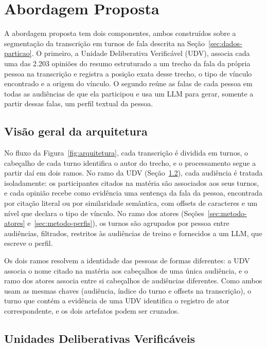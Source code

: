 \section{Abordagem Proposta}
\label{sec:metodo}

A abordagem proposta tem dois componentes, ambos construídos sobre a segmentação da transcrição em
turnos de fala descrita na Seção~\ref{sec:dados-particao}. O primeiro, a Unidade Deliberativa
Verificável (UDV), associa cada uma das 2.203 opiniões do resumo estruturado a um trecho da fala da
própria pessoa na transcrição e registra a posição exata desse trecho, o tipo de vínculo encontrado e
a origem do vínculo. O segundo reúne as falas de cada pessoa em todas as audiências de que ela
participou e usa um LLM para gerar, somente a partir dessas falas, um perfil textual da pessoa.

\subsection{Visão geral da arquitetura}
\label{sec:metodo-visao}



No fluxo da Figura~\ref{fig:arquitetura}, cada transcrição é dividida em turnos, o cabeçalho
de cada turno identifica o autor do trecho, e o processamento segue a partir daí em dois ramos. No
ramo da UDV (Seção~\ref{sec:metodo-udv}), cada audiência é tratada isoladamente: os participantes
citados na matéria são associados aos seus turnos, e cada opinião recebe como evidência uma sentença
da fala da pessoa, encontrada por citação literal ou por similaridade semântica, com offsets de
caracteres e um nível que declara o tipo de vínculo. No ramo dos atores
(Seções~\ref{sec:metodo-atores} e~\ref{sec:metodo-perfis}), os turnos são agrupados por pessoa entre
audiências, filtrados, restritos às audiências de treino e fornecidos a um LLM, que escreve o perfil.

Os dois ramos resolvem a identidade das pessoas de formas diferentes: a UDV associa o nome citado na
matéria aos cabeçalhos de uma única audiência, e o ramo dos atores associa entre si cabeçalhos de
audiências diferentes. Como ambos usam as mesmas chaves (audiência, índice do turno e offsets na
transcrição), o turno que contém a evidência de uma UDV identifica o registro de ator
correspondente, e os dois artefatos podem ser cruzados.

\subsection{Unidades Deliberativas Verificáveis}
\label{sec:metodo-udv}

